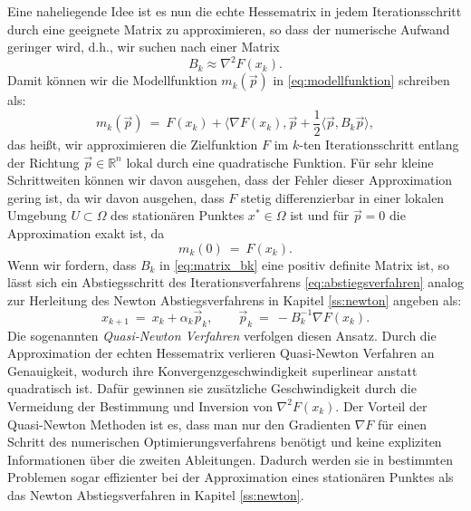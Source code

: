Eine naheliegende Idee ist es nun die echte Hessematrix in jedem Iterationsschritt durch eine geeignete Matrix zu approximieren, so dass der numerische Aufwand geringer wird, d.h., wir suchen nach einer Matrix
\begin{equation}
\label{eq:matrix_bk}
B_k \approx \nabla^2 F(x_k).
\end{equation}
Damit können wir die Modellfunktion $m_k(\vec{p})$ in \eqref{eq:modellfunktion} schreiben als:
\begin{equation*}
m_k(\vec{p}) \ = \ F(x_k) + \langle \nabla F(x_k), \vec{p} + \frac{1}{2} \langle \vec{p}, B_k \vec{p} \rangle,
\end{equation*}
das heißt, wir approximieren die Zielfunktion $F$ im $k$-ten Iterationsschritt entlang der Richtung $\vec{p} \in \mathbb{R}^n$ lokal durch eine quadratische Funktion.
Für sehr kleine Schrittweiten können wir davon ausgehen, dass der Fehler dieser Approximation gering ist, da wir davon ausgehen, dass $F$ stetig differenzierbar in einer lokalen Umgebung $U \subset \Omega$ des stationären Punktes $x^* \in \Omega$ ist und für $\vec{p} = 0$ die Approximation exakt ist, da
\begin{equation*}
m_k(0) \ = \ F(x_k).
\end{equation*}
Wenn wir fordern, dass $B_k$ in \eqref{eq:matrix_bk} eine positiv definite Matrix ist, so lässt sich ein Abstiegsschritt des Iterationsverfahrens \eqref{eq:abstiegsverfahren} analog zur Herleitung des Newton Abstiegsverfahrens in Kapitel \ref{ss:newton} angeben als:
\begin{equation}
\label{eq:quasi-newton-abstieg}
x_{k+1} \ = \ x_k + \alpha_k \vec{p}_k, \qquad \vec{p}_k \ = \ -B_k^{-1} \nabla F(x_k).
\end{equation}
Die sogenannten \emph{Quasi-Newton Verfahren} verfolgen diesen Ansatz. 
Durch die Approximation der echten Hessematrix verlieren Quasi-Newton Verfahren an Genauigkeit, wodurch ihre Konvergenzgeschwindigkeit superlinear anstatt quadratisch ist. 
Dafür gewinnen sie zusätzliche Geschwindigkeit durch die Vermeidung der Bestimmung und Inversion von $\nabla^2 F(x_k)$.
Der Vorteil der Quasi-Newton Methoden ist es, dass man nur den Gradienten $\nabla F$ für einen Schritt des numerischen Optimierungsverfahrens benötigt und keine expliziten Informationen über die zweiten Ableitungen.
Dadurch werden sie in bestimmten Problemen sogar effizienter bei der Approximation eines stationären Punktes als das Newton Abstiegsverfahren in Kapitel \ref{ss:newton}.


